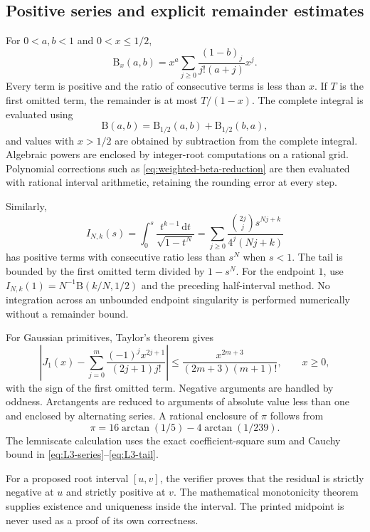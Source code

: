 \documentclass[11pt,a4paper]{article}
\numberwithin{equation}{section}
\theoremstyle{definition}
\theoremstyle{remark}
\newcommand{\B}{\mathrm B}
\newcommand{\dd}{\,\mathrm d}
\begin{document}
\subsection{Positive series and explicit remainder estimates}
For $0<a,b<1$ and $0<x\le1/2$,
\begin{equation}\label{eq:beta-positive-series}
 \B_x(a,b)=x^a\sum_{j\ge0}
 \frac{(1-b)_j}{j!(a+j)}x^j.
\end{equation}
Every term is positive and the ratio of consecutive terms is less than
$x$. If $T$ is the first omitted term, the remainder is at most
$T/(1-x)$. The complete integral is evaluated using
\[
 \B(a,b)=\B_{1/2}(a,b)+\B_{1/2}(b,a),
\]
and values with $x>1/2$ are obtained by subtraction from the complete
integral. Algebraic powers are enclosed by integer-root computations
on a rational grid. Polynomial corrections such as
\eqref{eq:weighted-beta-reduction} are then evaluated with rational interval
arithmetic, retaining the rounding error at every step.

Similarly,
\begin{equation}\label{eq:arc-cert-series}
 I_{N,k}(s)=\int_0^s\frac{t^{k-1}\dd t}{\sqrt{1-t^N}}
 =\sum_{j\ge0}\frac{\binom{2j}{j}s^{Nj+k}}{4^j(Nj+k)}
\end{equation}
has positive terms with consecutive ratio less than $s^N$ when $s<1$.
The tail is bounded by the first omitted term divided by $1-s^N$.
For the endpoint $1$, use
$I_{N,k}(1)=N^{-1}\B(k/N,1/2)$ and the preceding half-interval method.
No integration across an unbounded endpoint singularity is performed
numerically without a remainder bound.

For Gaussian primitives, Taylor's theorem gives
\begin{equation}
 \left|J_1(x)-\sum_{j=0}^m
 \frac{(-1)^jx^{2j+1}}{(2j+1)j!}\right|
 \le\frac{x^{2m+3}}{(2m+3)(m+1)!},\qquad x\ge0,
\end{equation}
with the sign of the first omitted term. Negative arguments are handled
by oddness. Arctangents are reduced to arguments of absolute value less
than one and enclosed by alternating series. A rational enclosure of
$\pi$ follows from
\begin{equation}
 \pi=16\arctan(1/5)-4\arctan(1/239).
\end{equation}
The lemniscate calculation uses the exact coefficient-square sum and
Cauchy bound in \eqref{eq:L3-series}--\eqref{eq:L3-tail}.

For a proposed root interval $[u,v]$, the verifier proves that the
residual is strictly negative at $u$ and strictly positive at $v$.
The mathematical monotonicity theorem supplies existence and uniqueness
inside the interval. The printed midpoint is never used as a proof of
its own correctness.
\end{document}
